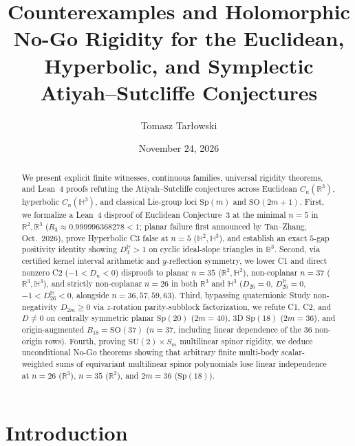 \documentclass[11pt,reqno]{amsart}
\title[Atiyah--Sutcliffe Counterexamples and No-Go Rigidity]{Counterexamples and Holomorphic No-Go Rigidity for the Euclidean, Hyperbolic, and Symplectic Atiyah--Sutcliffe Conjectures}
\author{Tomasz Tar\l owski}
\date{November 24, 2026}
\theoremstyle{remark}
\begin{document}
\begin{abstract}
We present explicit finite witnesses, continuous families, universal rigidity theorems, and Lean~4 proofs refuting the Atiyah--Sutcliffe conjectures across Euclidean $C_n(\mathbb{R}^3)$, hyperbolic $C_n(\mathbb{H}^3)$, and classical Lie-group loci $\mathrm{Sp}(m)$ and $\mathrm{SO}(2m+1)$.
First, we formalize a Lean~4 disproof of Euclidean Conjecture~3 at the minimal $n = 5$ in $\mathbb{R}^2, \mathbb{R}^3$ ($R_3 \approx 0.999996368278 < 1$; planar failure first announced by Tan--Zhang, Oct.~2026), prove Hyperbolic C3 false at $n = 5$ ($\mathbb{H}^2, \mathbb{H}^3$), and establish an exact $5$-gap positivity identity showing $D_3^{\mathbb{H}} > 1$ on cyclic ideal-slope triangles in $\mathbb{B}^3$.
Second, via certified kernel interval arithmetic and $y$-reflection symmetry, we lower C1 and direct nonzero C2 ($-1 < D_n < 0$) disproofs to planar $n = 35$ ($\mathbb{R}^2, \mathbb{H}^2$), non-coplanar $n = 37$ ($\mathbb{R}^3, \mathbb{H}^3$), and strictly non-coplanar $n = 26$ in both $\mathbb{R}^3$ and $\mathbb{H}^3$ ($D_{26} = 0$, $D_{26}^{\mathbb{H}} = 0$, $-1 < D_{26}^{\mathbb{H}} < 0$, alongside $n = 36, 57, 59, 63$).
Third, bypassing quaternionic Study non-negativity $D_{2m} \ge 0$ via $z$-rotation parity-subblock factorization, we refute C1, C2, and $D \ne 0$ on centrally symmetric planar $\mathrm{Sp}(20)$ ($2m = 40$), 3D $\mathrm{Sp}(18)$ ($2m = 36$), and origin-augmented $B_{18} = \mathrm{SO}(37)$ ($n = 37$, including linear dependence of the $36$ non-origin rows).
Fourth, proving $\mathrm{SU}(2) \times S_m$ multilinear spinor rigidity, we deduce unconditional No-Go theorems showing that arbitrary finite multi-body scalar-weighted sums of equivariant multilinear spinor polynomials lose linear independence at $n = 26$ ($\mathbb{R}^3$), $n = 35$ ($\mathbb{R}^2$), and $2m = 36$ ($\mathrm{Sp}(18)$).
\end{abstract}

\maketitle

\section{Introduction}
\end{document}
